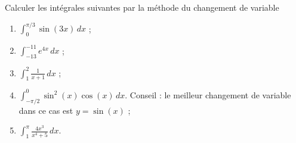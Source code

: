 
\begin{exercice}\label{exoTD5-a-0002}

Calculer les intégrales suivantes par la méthode du changement de variable 
\begin{enumerate}
\item $\displaystyle \int_0^{\pi/3} \sin(3x)\, dx $ ;
  \item $\displaystyle \int_{-13}^{-11} e^{4x}\, dx $ ;
    \item $\displaystyle \int_1^2 \frac{1}{x+1}\, dx $ ;
      \item $\displaystyle \int_{-\pi/2}^{0} \sin^2(x)\cos(x) \, dx $. Conseil : le meilleur changement de variable dans ce cas est $y=\sin(x)$ ;
        \item $\displaystyle \int_{1}^{\pi} \frac{4x^3}{x^4+5}\, dx$.
\end{enumerate}
  
\end{exercice}
